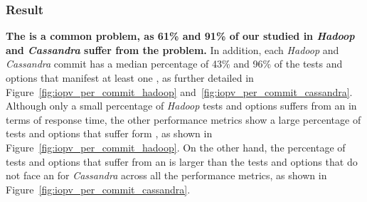 \subsubsection*{Result}

\noindent \textbf{The \inconsistent is a common problem, as 61\% and 91\% of our studied \instance in \emph{Hadoop} and \emph{Cassandra} suffer from the \inconsistent problem.} In addition, each \emph{Hadoop} and \emph{Cassandra} commit has a median percentage of 43\% and 96\% of the tests and options that manifest at least one \inconsistent, as further detailed in Figure~\ref{fig:iopv_per_commit_hadoop} and~\ref{fig:iopv_per_commit_cassandra}. Although only a small percentage of \emph{Hadoop} tests and options suffers from an \inconsistent in terms of response time, the other performance metrics show a large percentage of tests and options that suffer form \inconsistent, as shown in Figure~\ref{fig:iopv_per_commit_hadoop}. On the other hand, the percentage of tests and options that suffer from an \inconsistent is larger than the tests and options that do not face an \inconsistent for \emph{Cassandra} across all the performance metrics, as shown in Figure~\ref{fig:iopv_per_commit_cassandra}.  %

